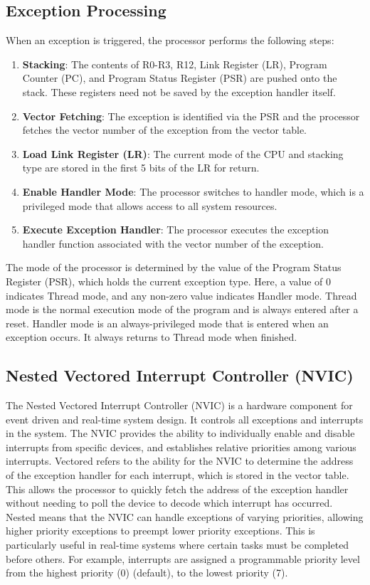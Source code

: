 \documentclass{article}
\begin{document}
\subsection{Exception Processing}
When an exception is triggered, the processor performs the following
steps:
\begin{enumerate}
    \item \textbf{Stacking}: The contents of R0-R3, R12, Link Register
          (LR), Program Counter (PC), and Program Status Register
          (PSR) are pushed onto the stack. These registers need not be
          saved by the exception handler itself.
    \item \textbf{Vector Fetching}: The exception is identified via the
          PSR and the processor fetches the vector number of the
          exception from the vector table.
    \item \textbf{Load Link Register (LR)}: The current mode of the CPU
          and stacking type are stored in the first 5 bits of the LR for
          return.
    \item \textbf{Enable Handler Mode}: The processor switches to
          handler mode, which is a privileged mode that allows access to
          all system resources.
    \item \textbf{Execute Exception Handler}: The processor executes the
          exception handler function associated with the vector number
          of the exception.
\end{enumerate}
The mode of the processor is determined by the value of the
Program Status Register (PSR), which holds the current exception type.
Here, a value of 0 indicates Thread mode, and any non-zero value
indicates Handler mode. Thread mode is the normal execution mode of the
program and is always entered after a reset. Handler mode is an
always-privileged mode that is entered when an exception occurs. It
always returns to Thread mode when finished.
\subsection{Nested Vectored Interrupt Controller (NVIC)}
The Nested Vectored Interrupt Controller (NVIC) is a hardware component
for event driven and real-time system design. It controls all
exceptions and interrupts in the system. The NVIC provides the ability
to individually enable and disable interrupts from specific devices,
and establishes relative priorities among various interrupts. Vectored
refers to the ability for the NVIC to determine the address of the
exception handler for each interrupt, which is stored in the vector
table. This allows the processor to quickly fetch the address of the
exception handler without needing to poll the device to decode which
interrupt has occurred. Nested means that the NVIC can handle
exceptions of varying priorities, allowing higher priority exceptions
to preempt lower priority exceptions. This is particularly useful in
real-time systems where certain tasks must be completed before others.
For example, interrupts are assigned a programmable priority level from
the highest priority (0) (default), to the lowest priority (7).
\end{document}

